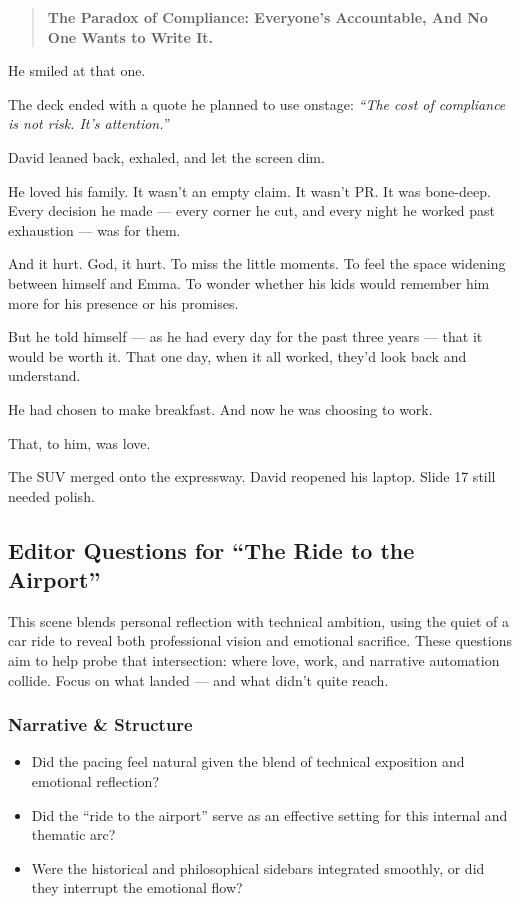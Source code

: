 \begin{quote}
    \centering
    \textbf{The Paradox of Compliance: Everyone’s Accountable, And No One Wants to Write It.}
\end{quote}

He smiled at that one.

The deck ended with a quote he planned to use onstage:
\textit{“The cost of compliance is not risk. It’s attention.”}

David leaned back, exhaled, and let the screen dim.

He loved his family.
It wasn’t an empty claim. It wasn’t PR. It was bone-deep.
Every decision he made — every corner he cut, and every night he worked past exhaustion — was for them.

And it hurt. God, it hurt.
To miss the little moments. To feel the space widening between himself and Emma.
To wonder whether his kids would remember him more for his presence or his promises.

But he told himself --- as he had every day for the past three years --- that it would be worth it.
That one day, when it all worked, they’d look back and understand.

He had chosen to make breakfast.
And now he was choosing to work.

That, to him, was love.

The SUV merged onto the expressway.
David reopened his laptop.
Slide 17 still needed polish.

\subsection*{Editor Questions for ``The Ride to the Airport''}

This scene blends personal reflection with technical ambition, using the quiet of a car ride to reveal both professional vision and emotional sacrifice. These questions aim to help probe that intersection: where love, work, and narrative automation collide. Focus on what landed — and what didn’t quite reach.

\subsubsection*{Narrative \& Structure}

\begin{itemize}
  \item Did the pacing feel natural given the blend of technical exposition and emotional reflection?
  \item Did the “ride to the airport” serve as an effective setting for this internal and thematic arc?
  \item Were the historical and philosophical sidebars integrated smoothly, or did they interrupt the emotional flow?
\end{itemize}

